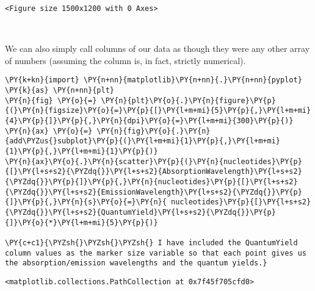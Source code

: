     
    \begin{Verbatim}[commandchars=\\\{\}]
<Figure size 1500x1200 with 0 Axes>
    \end{Verbatim}

    
    \begin{center}
    \end{center}
    { \hspace*{\fill} \\}
    
    We can also simply call columns of our data as though they were any
other array of numbers (assuming the column is, in fact, strictly
numerical).

    \begin{tcolorbox}[breakable, size=fbox, boxrule=1pt, pad at break*=1mm,colback=cellbackground, colframe=cellborder]
\begin{Verbatim}[commandchars=\\\{\}]
\PY{k+kn}{import} \PY{n+nn}{matplotlib}\PY{n+nn}{.}\PY{n+nn}{pyplot} \PY{k}{as} \PY{n+nn}{plt}
\PY{n}{fig} \PY{o}{=} \PY{n}{plt}\PY{o}{.}\PY{n}{figure}\PY{p}{(}\PY{n}{figsize}\PY{o}{=}\PY{p}{[}\PY{l+m+mi}{5}\PY{p}{,}\PY{l+m+mi}{4}\PY{p}{]}\PY{p}{,}\PY{n}{dpi}\PY{o}{=}\PY{l+m+mi}{300}\PY{p}{)}
\PY{n}{ax} \PY{o}{=} \PY{n}{fig}\PY{o}{.}\PY{n}{add\PYZus{}subplot}\PY{p}{(}\PY{l+m+mi}{1}\PY{p}{,}\PY{l+m+mi}{1}\PY{p}{,}\PY{l+m+mi}{1}\PY{p}{)}
\PY{n}{ax}\PY{o}{.}\PY{n}{scatter}\PY{p}{(}\PY{n}{nucleotides}\PY{p}{[}\PY{l+s+s2}{\PYZdq{}}\PY{l+s+s2}{AbsorptionWavelength}\PY{l+s+s2}{\PYZdq{}}\PY{p}{]}\PY{p}{,}\PY{n}{nucleotides}\PY{p}{[}\PY{l+s+s2}{\PYZdq{}}\PY{l+s+s2}{EmissionWavelength}\PY{l+s+s2}{\PYZdq{}}\PY{p}{]}\PY{p}{,}\PY{n}{s}\PY{o}{=}\PY{n}{ nucleotides}\PY{p}{[}\PY{l+s+s2}{\PYZdq{}}\PY{l+s+s2}{QuantumYield}\PY{l+s+s2}{\PYZdq{}}\PY{p}{]}\PY{o}{*}\PY{l+m+mi}{5}\PY{p}{)}

\PY{c+c1}{\PYZsh{}\PYZsh{}\PYZsh{} I have included the QuantumYield column values as the marker size variable so that each point gives us the absorption/emission wavelengths and the quantum yields.}
\end{Verbatim}
\end{tcolorbox}

            \begin{tcolorbox}[breakable, size=fbox, boxrule=.5pt, pad at break*=1mm, opacityfill=0]
\begin{Verbatim}[commandchars=\\\{\}]
<matplotlib.collections.PathCollection at 0x7f45f705cfd0>
\end{Verbatim}
\end{tcolorbox}
        
    \begin{center}
    \end{center}
    { \hspace*{\fill} \\}